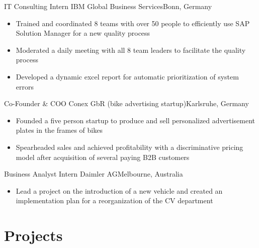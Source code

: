 \documentclass{my_cv}
\begin{document}
{IT Consulting Intern}
{IBM Global Business Services}{Bonn, Germany}
{}
{
\begin{itemize}
\item Trained and coordinated 8 teams with over 50 people to efficiently use SAP Solution Manager for a new quality process
\item Moderated a daily meeting with all 8 team leaders to facilitate the quality process
\item Developed a dynamic excel report for automatic prioritization of system errors
\end{itemize}
}  %

{Co-Founder \& COO}
{Conex GbR (bike advertising startup)}{Karlsruhe, Germany}
{}
{
\begin{itemize}
\item Founded a five person startup to produce and sell personalized advertisement plates in the frames of bikes
\item Spearheaded sales and achieved profitability with a discriminative pricing model after acquisition of several paying B2B customers
\end{itemize}
}  %

{Business Analyst Intern}
{Daimler AG}{Melbourne, Australia}
{}
{
\begin{itemize}
\item Lead a project on the introduction of a new vehicle and created an implementation plan for a reorganization of the CV department
\end{itemize}
}  %

\section{Projects}
\end{document}
